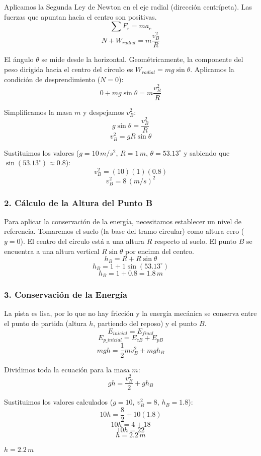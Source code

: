 \documentclass[12pt, a4paper]{article}
\begin{document}
Aplicamos la Segunda Ley de Newton en el eje radial (dirección centrípeta). Las fuerzas que apuntan hacia el centro son positivas.
$$ \sum F_r = m a_c $$
$$ N + W_{radial} = m \frac{v_B^2}{R} $$

El ángulo $\theta$ se mide desde la horizontal. Geométricamente, la componente del peso dirigida hacia el centro del círculo es $W_{radial} = mg \sin\theta$.
Aplicamos la condición de desprendimiento ($N = 0$):
$$ 0 + mg \sin\theta = m \frac{v_B^2}{R} $$

Simplificamos la masa $m$ y despejamos $v_B^2$:
$$ g \sin\theta = \frac{v_B^2}{R} $$
$$ v_B^2 = g R \sin\theta $$

Sustituimos los valores ($g = 10 \, \si{m/s^2}$, $R = 1 \, \si{m}$, $\theta = 53.13^\circ$ y sabiendo que $\sin(53.13^\circ) \approx 0.8$):
$$ v_B^2 = (10)(1)(0.8) $$
$$ v_B^2 = 8 \, (\si{m/s})^2 $$

\subsubsection*{2. Cálculo de la Altura del Punto B}
Para aplicar la conservación de la energía, necesitamos establecer un nivel de referencia. Tomaremos el suelo (la base del tramo circular) como altura cero ($y = 0$).
El centro del círculo está a una altura $R$ respecto al suelo. El punto $B$ se encuentra a una altura vertical $R \sin\theta$ por encima del centro.
$$ h_B = R + R \sin\theta $$
$$ h_B = 1 + 1 \sin(53.13^\circ) $$
$$ h_B = 1 + 0.8 = 1.8 \, \si{m} $$

\subsubsection*{3. Conservación de la Energía}
La pista es lisa, por lo que no hay fricción y la energía mecánica se conserva entre el punto de partida (altura $h$, partiendo del reposo) y el punto $B$.
$$ E_{inicial} = E_{final} $$
$$ E_{p\_inicial} = E_{cB} + E_{pB} $$
$$ mgh = \frac{1}{2} m v_B^2 + mgh_B $$

Dividimos toda la ecuación para la masa $m$:
$$ gh = \frac{v_B^2}{2} + gh_B $$

Sustituimos los valores calculados ($g = 10$, $v_B^2 = 8$, $h_B = 1.8$):
$$ 10h = \frac{8}{2} + 10(1.8) $$
$$ 10h = 4 + 18 $$
$$ 10h = 22 $$
$$ h = 2.2 \, \si{m} $$

\begin{tcolorbox}[colback=green!5!white, colframe=green!50!black, title=Respuesta Final]
\centering \Large $h = 2.2 \, \si{m}$
\end{tcolorbox}
\end{document}
